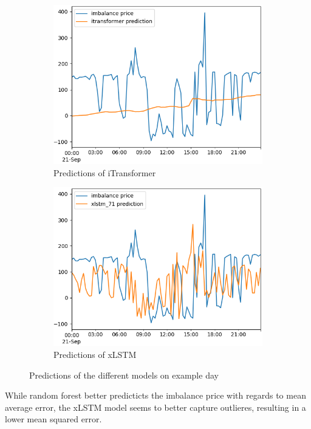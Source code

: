 \documentclass[class=scrbook, crop=false]{standalone}
\begin{document}
\begin{figure}
\begin{subfigure}{0.45\textwidth}
  \includegraphics[width=\linewidth]{../images/results/itransformer_prediction.png}
  \caption{Predictions of iTransformer}
\end{subfigure}
\begin{subfigure}{0.45\textwidth}
  \includegraphics[width=\linewidth]{../images/results/xlstm_prediction.png}
  \caption{Predictions of xLSTM}
\end{subfigure}
\caption{Predictions of the different models on example day}
\label{Figure::Model_predictions}
\end{figure}

While random forest better predicticts the imbalance price with regards to mean average error, the xLSTM model seems to better capture outlieres, resulting in a lower mean squared error.
\end{document}
